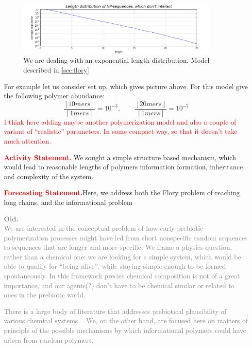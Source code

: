 \documentclass[12pt]{paper}
\newcommand{\pq}[1]{\left[ #1 \right]}
\newcommand{\red}[1]{\textcolor{red}{#1}}
\newcommand{\gray}[1]{\textcolor{gray}{#1}}
\begin{document}
\begin{figure}[h!]
  \centering
  \includegraphics[width=0.9\textwidth]{pictures/flory.png} 
  \caption{We are dealing with an exponential length distribution. 
    Model described in \ref{sec:flory}}
  \label{fig:flory}
\end{figure}

For example let us consider set up, which gives picture above. For this model give the following 
polymer abundance:
\begin{equation}
  \frac{\pq{10mers}}{\pq{1mers}}=10^{-3},\qquad\frac{\pq{20mers}}{\pq{1mers}}=10^{-7}
\end{equation} 
\red{I think here adding maybe another polymerization model and also a couple of variant of 
  ``realistic'' parameters. In some compact way, so that it doesn't take much attention.}

\noindent\red{\textbf{Activity Statement.}} We sought a simple structure based mechanism, which 
would lead to reasonable lengths of polymers information formation, inheritance and complexity of 
the system.

\noindent\red{\textbf{Forecasting Statement.}}Here, we address both the Flory problem of reaching 
long chains, and the informational problem

\gray{\textbf{Old.}\\
We are interested in the conceptual problem of how early prebiotic polymerization processes 
might have led from short nonspecific random sequences to sequences that are longer and more specific.  
We frame a physics question, rather than a chemical one:  we are looking for a simple system, 
which would be able to qualify for ``being alive'',  while staying simple enough to be formed 
spontaneously. In this framework precise chemical composition is not of a great importance, and 
our agents(?) don't have to be chemical similar or related to ones in the prebiotic world.}

\gray{
There is a large body of literature that addresses prebiotical plausibility of various chemical 
systems. \cite{Orgel,}.  
We, on the other hand, are focused here on matters of principle of the possible mechanisms 
by which informational polymers could have arisen from random polymers.  
}
\end{document}
